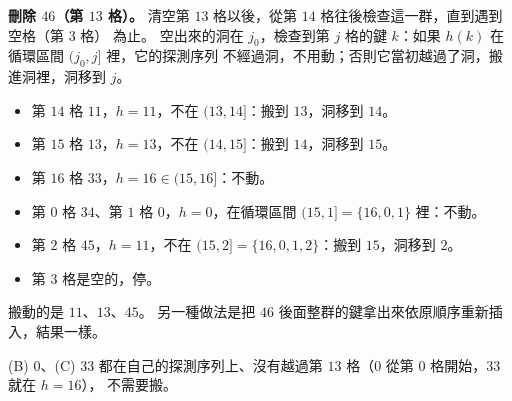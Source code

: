 \begin{pastsoln}
\textbf{刪除 $46$（第 $13$ 格）。} 清空第 $13$ 格以後，從第 $14$ 格往後檢查這一群，直到遇到空格（第 $3$ 格）
為止。 空出來的洞在 $j_0$，檢查到第 $j$ 格的鍵 $k$：如果 $h(k)$ 在循環區間 $(j_0, j]$ 裡，它的探測序列
不經過洞，不用動；否則它當初越過了洞，搬進洞裡，洞移到 $j$。
\begin{itemize}
\item 第 $14$ 格 $11$，$h = 11$，不在 $(13, 14]$：搬到 $13$，洞移到 $14$。
\item 第 $15$ 格 $13$，$h = 13$，不在 $(14, 15]$：搬到 $14$，洞移到 $15$。
\item 第 $16$ 格 $33$，$h = 16 \in (15, 16]$：不動。
\item 第 $0$ 格 $34$、第 $1$ 格 $0$，$h = 0$，在循環區間 $(15, 1] = \{16, 0, 1\}$ 裡：不動。
\item 第 $2$ 格 $45$，$h = 11$，不在 $(15, 2] = \{16, 0, 1, 2\}$：搬到 $15$，洞移到 $2$。
\item 第 $3$ 格是空的，停。
\end{itemize}
搬動的是 $11$、$13$、$45$。 另一種做法是把 $46$ 後面整群的鍵拿出來依原順序重新插入，結果一樣。

(B) $0$、(C) $33$ 都在自己的探測序列上、沒有越過第 $13$ 格（$0$ 從第 $0$ 格開始，$33$ 就在 $h = 16$），
不需要搬。
\end{pastsoln}
